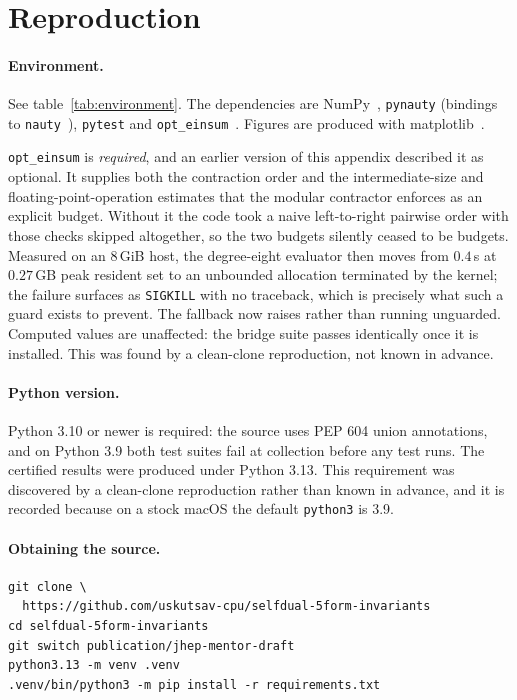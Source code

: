 \section{Reproduction}
\label{app:reproduction}

\paragraph{Environment.}
See table~\ref{tab:environment}. The dependencies are NumPy~\cite{Harris:2020},
\texttt{pynauty} (bindings to \texttt{nauty}~\cite{McKay:2013}),
\texttt{pytest} and \texttt{opt\_einsum}~\cite{Smith:2018}. Figures are
produced with matplotlib~\cite{Hunter:2007}.

\texttt{opt\_einsum} is \emph{required}, and an earlier version of this appendix
described it as optional. It supplies both the contraction order and the
intermediate-size and floating-point-operation estimates that the modular
contractor enforces as an explicit budget. Without it the code took a naive
left-to-right pairwise order with those checks skipped altogether, so the two
budgets silently ceased to be budgets. Measured on an 8\,GiB host, the
degree-eight evaluator then moves from $0.4$\,s at $0.27$\,GB peak resident set
to an unbounded allocation terminated by the kernel; the failure surfaces as
\texttt{SIGKILL} with no traceback, which is precisely what such a guard exists
to prevent. The fallback now raises rather than running unguarded. Computed
values are unaffected: the bridge suite passes identically once it is installed.
This was found by a clean-clone reproduction, not known in advance.

\paragraph{Python version.}
Python 3.10 or newer is required: the source uses PEP 604 union annotations, and
on Python 3.9 both test suites fail at collection before any test runs. The
certified results were produced under Python 3.13. This requirement was
discovered by a clean-clone reproduction rather than known in advance, and it is
recorded because on a stock macOS the default \texttt{python3} is 3.9.

\paragraph{Obtaining the source.}
\begingroup\scriptsize
\begin{verbatim}
git clone \
  https://github.com/uskutsav-cpu/selfdual-5form-invariants
cd selfdual-5form-invariants
git switch publication/jhep-mentor-draft
python3.13 -m venv .venv
.venv/bin/python3 -m pip install -r requirements.txt
\end{verbatim}
\endgroup

